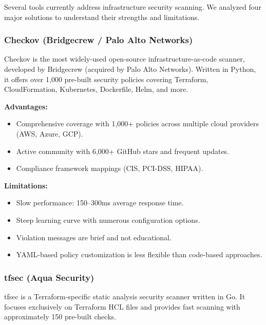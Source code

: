Several tools currently address infrastructure security scanning. We analyzed four major solutions to understand their strengths and limitations.

\subsubsection{Checkov (Bridgecrew / Palo Alto Networks)}

Checkov is the most widely-used open-source infrastructure-as-code scanner, developed by Bridgecrew (acquired by Palo Alto Networks). Written in Python, it offers over 1,000 pre-built security policies covering Terraform, CloudFormation, Kubernetes, Dockerfile, Helm, and more.

\textbf{Advantages:}
\begin{itemize}
    \item Comprehensive coverage with 1,000+ policies across multiple cloud providers (AWS, Azure, GCP).
    \item Active community with 6,000+ GitHub stars and frequent updates.
    \item Compliance framework mappings (CIS, PCI-DSS, HIPAA).
\end{itemize}

\textbf{Limitations:}
\begin{itemize}
    \item Slow performance: 150--300ms average response time.
    \item Steep learning curve with numerous configuration options.
    \item Violation messages are brief and not educational.
    \item YAML-based policy customization is less flexible than code-based approaches.
\end{itemize}


\subsubsection{tfsec (Aqua Security)}

tfsec is a Terraform-specific static analysis security scanner written in Go. It focuses exclusively on Terraform HCL files and provides fast scanning with approximately 150 pre-built checks.

